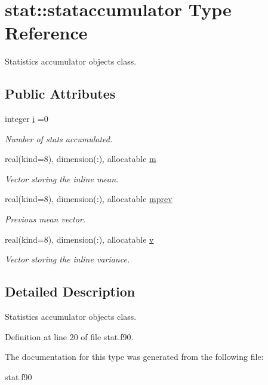 \hypertarget{structstat_1_1stataccumulator}{}\section{stat\+:\+:stataccumulator Type Reference}
\label{structstat_1_1stataccumulator}


Statistics accumulator objects class.  


\subsection*{Public Attributes}
\begin{DoxyCompactItemize}
\item 
\mbox{\label{structstat_1_1stataccumulator_aa8f9105e658b823c19d9e7a67c1cb10b}} 
integer \hyperlink{structstat_1_1stataccumulator_aa8f9105e658b823c19d9e7a67c1cb10b}{i} =0
\begin{DoxyCompactList}\small\item\em Number of stats accumulated. \end{DoxyCompactList}\item 
\mbox{\label{structstat_1_1stataccumulator_a6205ea1c87fe2aceaa1f5c554b33d3ab}} 
real(kind=8), dimension(\+:), allocatable \hyperlink{structstat_1_1stataccumulator_a6205ea1c87fe2aceaa1f5c554b33d3ab}{m}
\begin{DoxyCompactList}\small\item\em Vector storing the inline mean. \end{DoxyCompactList}\item 
\mbox{\label{structstat_1_1stataccumulator_a6f1236b8cb1c59845c1551b170be33c4}} 
real(kind=8), dimension(\+:), allocatable \hyperlink{structstat_1_1stataccumulator_a6f1236b8cb1c59845c1551b170be33c4}{mprev}
\begin{DoxyCompactList}\small\item\em Previous mean vector. \end{DoxyCompactList}\item 
\mbox{\label{structstat_1_1stataccumulator_a627af0d1895f670679a77742ac974c1c}} 
real(kind=8), dimension(\+:), allocatable \hyperlink{structstat_1_1stataccumulator_a627af0d1895f670679a77742ac974c1c}{v}
\begin{DoxyCompactList}\small\item\em Vector storing the inline variance. \end{DoxyCompactList}\end{DoxyCompactItemize}


\subsection{Detailed Description}
Statistics accumulator objects class. 

Definition at line 20 of file stat.\+f90.



The documentation for this type was generated from the following file\+:\begin{DoxyCompactItemize}
\item 
stat.\+f90\end{DoxyCompactItemize}
